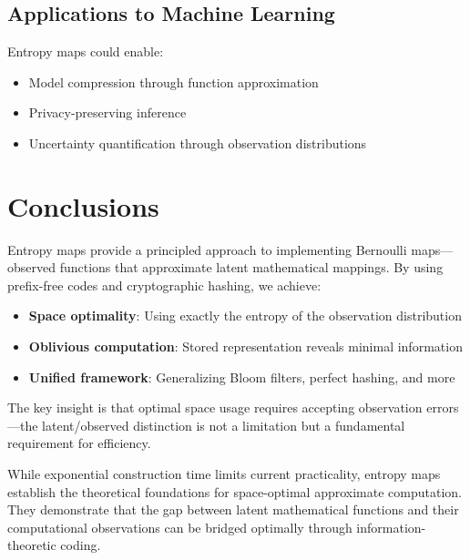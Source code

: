 \documentclass[11pt,final,hidelinks]{article}
\begin{document}
\subsection{Applications to Machine Learning}

Entropy maps could enable:
\begin{itemize}
    \item Model compression through function approximation
    \item Privacy-preserving inference
    \item Uncertainty quantification through observation distributions
\end{itemize}

\section{Conclusions}

Entropy maps provide a principled approach to implementing Bernoulli maps—observed functions that approximate latent mathematical mappings. By using prefix-free codes and cryptographic hashing, we achieve:

\begin{itemize}
    \item \textbf{Space optimality}: Using exactly the entropy of the observation distribution
    \item \textbf{Oblivious computation}: Stored representation reveals minimal information
    \item \textbf{Unified framework}: Generalizing Bloom filters, perfect hashing, and more
\end{itemize}

The key insight is that optimal space usage requires accepting observation errors—the latent/observed distinction is not a limitation but a fundamental requirement for efficiency.

While exponential construction time limits current practicality, entropy maps establish the theoretical foundations for space-optimal approximate computation. They demonstrate that the gap between latent mathematical functions and their computational observations can be bridged optimally through information-theoretic coding.


\end{document}
